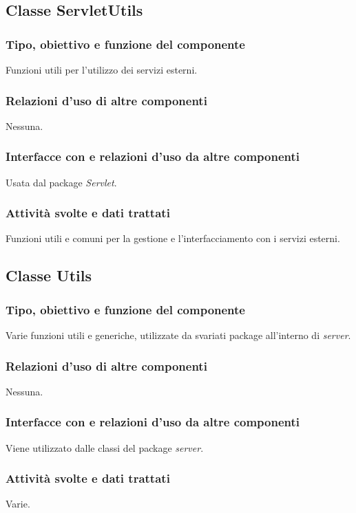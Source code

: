 \subsection{Classe ServletUtils}
\subsubsection*{Tipo, obiettivo e funzione del componente}
Funzioni utili per l'utilizzo dei servizi esterni.
\subsubsection*{Relazioni d'uso di altre componenti}
Nessuna.
\subsubsection*{Interfacce con e relazioni d'uso da altre componenti}
Usata dal package \emph{Servlet}.
\subsubsection*{Attivit\`a svolte e dati trattati}
Funzioni utili e comuni per la gestione e l'interfacciamento con i servizi
esterni.

\subsection{Classe Utils}
\subsubsection*{Tipo, obiettivo e funzione del componente}
Varie funzioni utili e generiche, utilizzate da svariati package all'interno di
\emph{server}.
\subsubsection*{Relazioni d'uso di altre componenti}
Nessuna.
\subsubsection*{Interfacce con e relazioni d'uso da altre componenti}
Viene utilizzato dalle classi del package \emph{server}.
\subsubsection*{Attivit\`a svolte e dati trattati}
Varie.

\newpage
